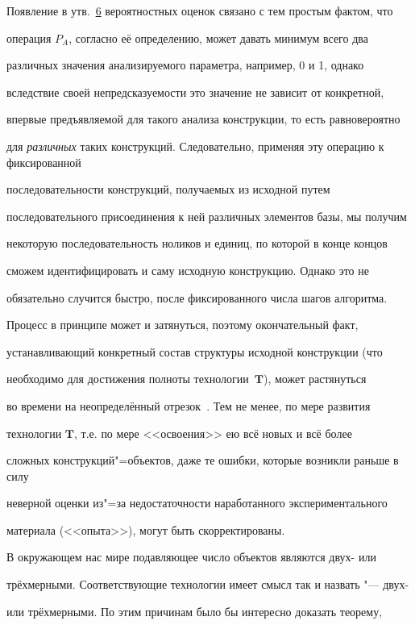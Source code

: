 \smallskip



Появление в утв.~\hyperlink{kr:utv6}{6} вероятностных оценок связано с тем простым фактом, что

операция $P_{A}$, согласно её определению, может давать минимум всего два

различных значения анализируемого параметра, например, 0 и 1, однако

вследствие своей непредсказуемости это значение не зависит от конкретной,

впервые предъявляемой для такого анализа конструкции, то есть равновероятно

для {\sl различных} таких конструкций. Следовательно, применяя эту операцию к фиксированной

последовательности конструкций, получаемых из исходной путем

последовательного присоединения к ней различных элементов базы, мы получим

некоторую последовательность ноликов и единиц, по которой в конце концов

сможем идентифицировать и саму исходную конструкцию. Однако это не

обязательно случится быстро, после фиксированного числа шагов алгоритма.

Процесс в принципе может и затянуться, поэтому окончательный факт,

устанавливающий конкретный состав структуры исходной конструкции (что

необходимо для достижения полноты технологии~$\mathbf{T}$), может растянуться

во времени на неопределённый отрезок~\cite{krylov:bib3}. Тем не менее, по мере развития

технологии $\mathbf{T}$, т.е. по мере <<освоения>> ею всё новых и всё более

сложных конструкций"=объектов, даже те ошибки, которые возникли раньше в силу

неверной оценки из"=за недостаточности наработанного экспериментального

материала (<<опыта>>), могут быть скорректированы.



В окружающем нас мире подавляющее число объектов являются двух- или

трёхмерными. Соответствующие технологии имеет смысл так и назвать "--- двух-

или трёхмерными. По этим причинам было бы интересно доказать теорему,

